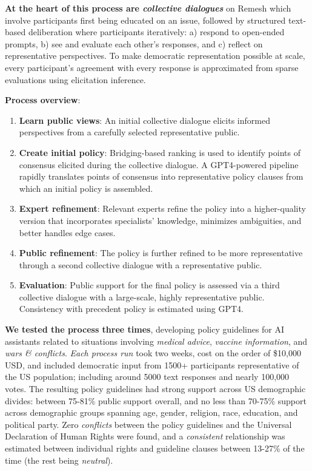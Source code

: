 \documentclass{article}
\begin{document}
\textbf{At the heart of this process are \emph{collective dialogues}} on Remesh which involve participants first being educated on an issue, followed by structured text-based deliberation where participants iteratively: a) respond to open-ended prompts, b) see and evaluate each other’s responses, and c) reflect on representative perspectives. To make democratic representation possible at scale, every participant's agreement with every response is approximated from sparse evaluations using elicitation inference.

\textbf{Process overview}:

\begin{enumerate}
\item \textbf{Learn public views}: An initial collective dialogue elicits informed perspectives from a carefully selected representative public.
\item \textbf{Create initial policy}: Bridging-based ranking is used to identify points of consensus elicited during the collective dialogue. A GPT4-powered pipeline rapidly translates points of consensus into representative policy clauses from which an initial policy is assembled. 
\item \textbf{Expert refinement}: Relevant experts refine the policy into a higher-quality version that incorporates specialists' knowledge, minimizes ambiguities, and better handles edge cases.
\item \textbf{Public refinement}: The policy is further refined to be more representative through a second collective dialogue with a representative public.
\item \textbf{Evaluation}: Public support for the final policy is assessed via a third collective dialogue with a large-scale, highly representative public. Consistency with precedent policy is estimated using GPT4.
\end{enumerate}
 
 \textbf{We tested the process three times}, developing policy guidelines for AI assistants related to situations involving \emph{medical advice}, \emph{vaccine information}, and \emph{wars \& conflicts}. \emph{Each process run} took two weeks, cost on the order of \$10,000 USD, and included democratic input from 1500+ participants representative of the US population; including around 5000 text responses and nearly 100,000 votes. The resulting policy guidelines had strong support across US demographic divides: between 75-81\% public support overall, and no less than 70-75\% support across demographic groups spanning age, gender, religion, race, education, and political party. Zero \emph{conflicts} between the policy guidelines and the Universal Declaration of Human Rights were found, and a \emph{consistent} relationship was estimated between individual rights and guideline clauses between 13-27\% of the time (the rest being
\emph{neutral}). 
\end{document}
